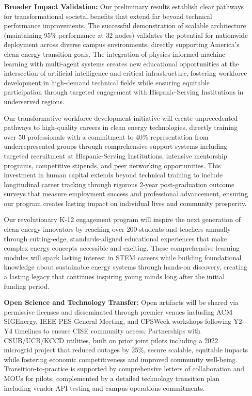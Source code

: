 \documentclass[12pt]{article}
\begin{document}
\textbf{Broader Impact Validation:} Our preliminary results establish clear pathways for transformational societal benefits that extend far beyond technical performance improvements. The successful demonstration of scalable architecture (maintaining 95\% performance at 32 nodes) validates the potential for nationwide deployment across diverse campus environments, directly supporting America's clean energy transition goals. The integration of physics-informed machine learning with multi-agent systems creates new educational opportunities at the intersection of artificial intelligence and critical infrastructure, fostering workforce development in high-demand technical fields while ensuring equitable participation through targeted engagement with Hispanic-Serving Institutions in underserved regions.

Our transformative workforce development initiative will create unprecedented pathways to high-quality careers in clean energy technologies, directly training over 50 professionals with a commitment to 40\% representation from underrepresented groups through comprehensive support systems including targeted recruitment at Hispanic-Serving Institutions, intensive mentorship programs, competitive stipends, and peer networking opportunities. This investment in human capital extends beyond technical training to include longitudinal career tracking through rigorous 2-year post-graduation outcome surveys that measure employment success and professional advancement, ensuring our program creates lasting impact on individual lives and community prosperity.

Our revolutionary K-12 engagement program will inspire the next generation of clean energy innovators by reaching over 200 students and teachers annually through cutting-edge, standards-aligned educational experiences that make complex energy concepts accessible and exciting. These comprehensive learning modules will spark lasting interest in STEM careers while building foundational knowledge about sustainable energy systems through hands-on discovery, creating a lasting legacy that continues inspiring young minds long after the initial funding period.

\textbf{Open Science and Technology Transfer:} Open artifacts will be shared via permissive licenses and disseminated through premier venues including ACM SIGEnergy, IEEE PES General Meeting, and CPSWeek workshops following Y2-Y4 timelines to ensure CISE community access. Partnerships with CSUB/UCB/KCCD utilities, built on prior joint pilots including a 2022 microgrid project that reduced outages by 25\%, secure scalable, equitable impacts while fostering economic competitiveness and improved community well-being. Transition-to-practice is supported by comprehensive letters of collaboration and MOUs for pilots, complemented by a detailed technology transition plan including vendor API testing and campus operations commitments.
\end{document}
